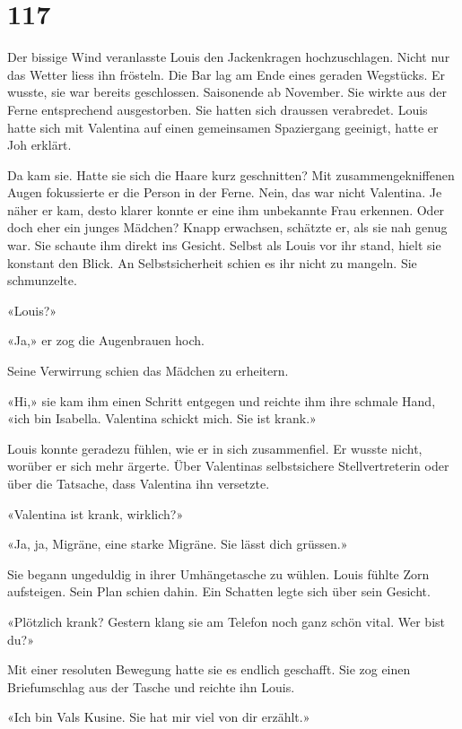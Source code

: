\chapter{117}



Der bissige Wind veranlasste Louis den Jackenkragen hochzuschlagen.
Nicht nur das Wetter liess ihn frösteln.
Die Bar lag am Ende eines geraden Wegstücks. Er wusste, sie war bereits
geschlossen. Saisonende ab November. Sie wirkte aus der Ferne
entsprechend ausgestorben.
Sie hatten sich draussen verabredet. Louis hatte sich mit Valentina auf
einen gemeinsamen Spaziergang geeinigt, hatte er Joh erklärt.

Da kam sie. Hatte sie sich die Haare kurz geschnitten? Mit zusammengekniffenen Augen fokussierte er die Person
in der Ferne. Nein, das war nicht Valentina. Je näher er kam, desto
klarer konnte er eine ihm unbekannte Frau erkennen. Oder doch eher ein junges Mädchen?
Knapp erwachsen, schätzte er, als sie nah genug war. Sie schaute ihm
direkt ins Gesicht. Selbst als Louis vor ihr stand, hielt sie konstant den Blick.
An Selbstsicherheit schien es ihr nicht zu mangeln.
Sie schmunzelte.

«Louis?»

«Ja,» er zog die Augenbrauen hoch.

Seine Verwirrung schien das Mädchen zu erheitern.

«Hi,» sie kam ihm einen Schritt entgegen und reichte ihm ihre schmale
Hand, «ich bin Isabella. Valentina schickt mich. Sie ist krank.»

Louis konnte geradezu fühlen, wie er in sich zusammenfiel. Er wusste
nicht, worüber er sich mehr ärgerte. Über Valentinas selbstsichere
Stellvertreterin oder über die Tatsache, dass Valentina ihn versetzte.

«Valentina ist krank, wirklich?»

«Ja, ja, Migräne, eine starke Migräne. Sie lässt dich grüssen.»

Sie begann ungeduldig in ihrer Umhängetasche zu wühlen.
Louis fühlte Zorn aufsteigen. Sein Plan schien dahin. Ein Schatten legte
sich über sein Gesicht.

«Plötzlich krank? Gestern klang sie am Telefon noch ganz schön vital.
Wer bist du?»

Mit einer resoluten Bewegung hatte sie es endlich geschafft. Sie zog
einen Briefumschlag aus der Tasche und reichte ihn Louis.

«Ich bin Vals Kusine. Sie hat mir viel von dir erzählt.»

